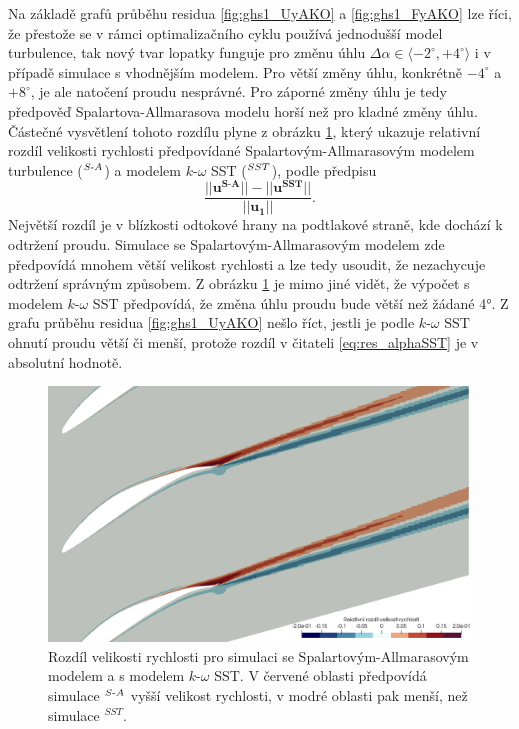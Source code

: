 Na základě grafů průběhu residua \ref{fig:ghs1_UyAKO} a \ref{fig:ghs1_FyAKO} lze říci, že přestože se v rámci optimalizačního cyklu používá jednodušší model turbulence, tak nový tvar lopatky funguje pro změnu úhlu $ \Delta\alpha\in\langle -2^\circ,+4^\circ\rangle $ i v případě simulace s vhodnějším modelem. Pro větší změny úhlu, konkrétně $ -4^\circ $ a $ +8^\circ $, je ale natočení proudu nesprávné. Pro záporné změny úhlu je tedy předpověď Spalartova-Allmarasova modelu horší než pro kladné změny úhlu.
Částečné vysvětlení tohoto rozdílu plyne z obrázku \ref{fig:ghs1_sakoUdiff}, který ukazuje relativní rozdíl velikosti rychlosti předpovídané Spalartovým-Allmarasovým modelem turbulence ($ \null^{S\text{-}A} $) a modelem $k\text{-}\omega$ SST ($ \null^{SST} $), podle předpisu
\begin{equation}\label{eq:ghs1_sakoUdiff}
\dfrac{||\mathbf{u^{S\text{-}A}||-||u^{SST}}||}{||\mathbf{u_1}||}.
\end{equation}
Největší rozdíl je v blízkosti odtokové hrany na podtlakové straně, kde dochází k odtržení proudu. Simulace se Spalartovým-Allmarasovým modelem zde předpovídá mnohem větší velikost rychlosti a lze tedy usoudit, že nezachycuje odtržení správným způsobem. Z obrázku \ref{fig:ghs1_sakoUdiff} je mimo jiné vidět, že výpočet s modelem $k\text{-}\omega$ SST předpovídá, že změna úhlu proudu bude větší než žádané 4°. Z grafu průběhu residua \ref{fig:ghs1_UyAKO} nešlo říct, jestli je podle $k\text{-}\omega$ SST ohnutí proudu větší či menší, protože rozdíl v čitateli \ref{eq:res_alphaSST} je v absolutní hodnotě.
\begin{figure}
\centering
\includegraphics[width=1\textwidth]{img/sako_magUdiff.png}
\caption[Rozdíl rychlosti pro modely turbulence]{
Rozdíl velikosti rychlosti pro simulaci se Spalartovým-Allmarasovým modelem a s modelem $k\text{-}\omega$ SST. V červené oblasti předpovídá simulace $ \null^{S\text{-}A} $ vyšší velikost rychlosti, v modré oblasti pak menší, než simulace $ ^{SST} $.}
\label{fig:ghs1_sakoUdiff}
\end{figure}







